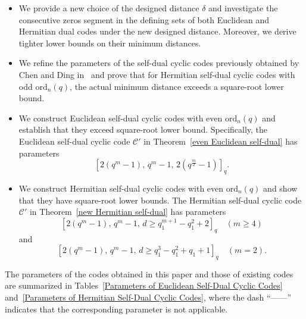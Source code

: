 \documentclass[10pt,a4paper]{amsart}
\begin{document}
\begin{itemize}
    \item We provide a new choice of the designed distance $\delta$ and investigate the consecutive zeros segment in the defining sets of both Euclidean and Hermitian dual codes under the new designed distance. Moreover, we derive tighter lower bounds on their minimum distances.
    \item We refine the parameters of the self-dual cyclic codes previously obtained by Chen and Ding in~\cite{10856234} and prove that for Hermitian self-dual cyclic codes with odd $\mathrm{ord}_n(q)$, the actual minimum distance exceeds a square-root lower bound.
    \item We construct Euclidean self-dual cyclic codes with even $\mathrm{ord}_n(q)$ and establish that they exceed square-root lower bound. Specifically, the Euclidean self-dual cyclic code $\mathcal{C}'$ in Theorem~\ref{even Euclidean self-dual} has parameters
    \[
    [2(q^m - 1),\, q^m - 1,\,2(q^{\frac{m}{2}} - 1)]_q.
    \]
    \item We construct Hermitian self-dual cyclic codes with even $\mathrm{ord}_n(q)$ and show that they have square-root lower bounds. The Hermitian self-dual cyclic code $\mathcal{C}'$ in Theorem~\ref{new Hermitian self-dual} has parameters
    \[
    [2(q^m - 1),\, q^m - 1,\, d \ge q_1^{m+1} - q_1^2 + 2]_q \quad (m\ge 4)
    \] and
    \[
    [2(q^m - 1),\, q^m - 1,\, d \ge q_1^3 - q_1^2 + q_1 + 1]_q \quad (m=2).
    \]
\end{itemize}
The parameters of the codes obtained in this paper and those of existing codes are summarized in Tables~\ref{Parameters of Euclidean Self-Dual Cyclic Codes} and~\ref{Parameters of Hermitian Self-Dual Cyclic Codes}, where the dash ``——'' indicates that the corresponding parameter is not applicable.
\end{document}
